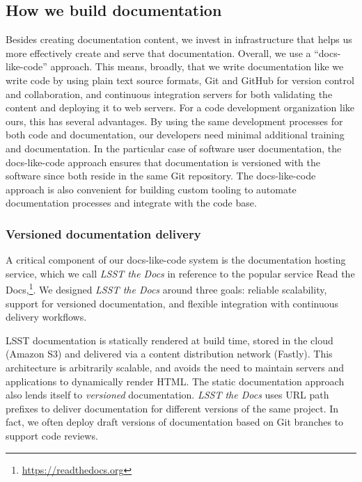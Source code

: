 \subsection{How we build documentation}
\label{sec:doc_builds}

Besides creating documentation content, we invest in infrastructure that helps us more effectively create and serve that documentation. 
Overall, we use a ``docs-like-code'' approach.\cite{Gentle:2017}
This means, broadly, that we write documentation like we write code by using plain text source formats, Git and GitHub for version control and collaboration, and continuous integration servers for both validating the content and deploying it to web servers.
For a code development organization like ours, this has several advantages.
By using the same development processes for both code and documentation, our developers need minimal additional training and documentation. 
In the particular case of software user documentation, the docs-like-code approach ensures that documentation is versioned with the software since both reside in the same Git repository.
The docs-like-code approach is also convenient for building custom tooling to automate documentation processes and integrate with the code base.

\subsubsection{Versioned documentation delivery}
\label{sec:ltd}

A critical component of our docs-like-code system is the documentation hosting service, which we call \textit{LSST the Docs}\cite{SQR-006} in reference to the popular service Read the Docs,\footnote{\url{https://readthedocs.org}}.
We designed \textit{LSST the Docs} around three goals: reliable scalability, support for versioned documentation, and flexible integration with continuous delivery workflows.

LSST documentation is statically rendered at build time, stored in the cloud (Amazon S3) and delivered via a content distribution network (Fastly).
This architecture is arbitrarily scalable, and avoids the need to maintain servers and applications to dynamically render HTML.
The static documentation approach also lends itself to \emph{versioned} documentation.
\textit{LSST the Docs} uses URL path prefixes to deliver documentation for different versions of the same project.
In fact, we often deploy draft versions of documentation based on Git branches to support code reviews.

